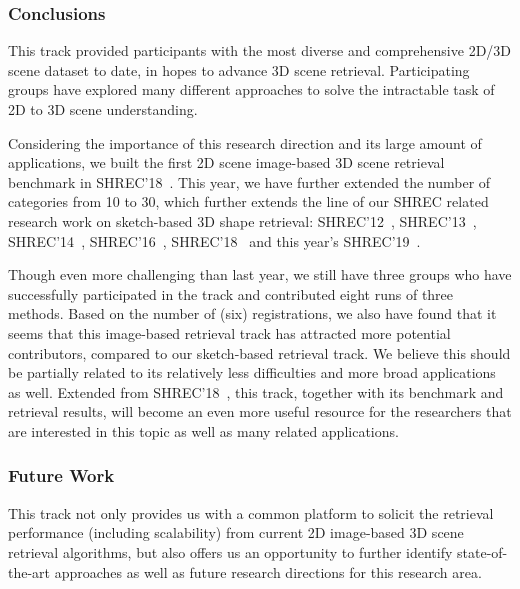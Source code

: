 \documentclass[../main.tex]{subfiles}
\begin{document}
\subsubsection{Conclusions}
This track provided participants with the most diverse and comprehensive 2D/3D scene dataset to date, in hopes to advance 3D scene retrieval. Participating groups have explored many different approaches to solve the intractable task of 2D to 3D scene understanding.

Considering the importance of this research direction and its large amount of applications, we built the first 2D scene image-based 3D scene retrieval benchmark in SHREC'18~\cite{SHREC18-SceneIBR-Track}. This year, we have further extended the number of categories from 10 to 30, which further extends the line of our SHREC related research work on sketch-based 3D shape retrieval: SHREC'12~\cite{DBLP:conf/3dor/LiSGABBCEFHHJKORSSYYY12, DBLP:journals/cviu/0013LGSBFFFJMOPS14}, SHREC'13~\cite{DBLP:conf/3dor/LiLGSAJST13, DBLP:journals/cviu/0013LGSBFFFJMOPS14}, SHREC'14~\cite{DBLP:conf/3dor/LiLLGSABFFJLOTZ14, DBLP:journals/cviu/LiLLGSABCCFFFLLJKKOTWZZ15}, SHREC'16~\cite{DBLP:conf/3dor/0013LDDFQLLLLOT16}, SHREC'18~\cite{SHREC18-SceneIBR-Track} and this year's SHREC'19~\cite{SceneIBR19}.

Though even more challenging than last year, we still have three groups who have successfully participated in the track and contributed eight runs of three methods. Based on the number of (six) registrations, we also have found that it seems that this image-based retrieval track has attracted more potential contributors, compared to our sketch-based retrieval track. We believe this should be partially related to its relatively less difficulties and more broad applications as well. Extended from SHREC'18~\cite{SHREC18-SceneIBR-Track}, this track, together with its benchmark and retrieval results, will become an even more useful resource for the researchers that are interested in this topic as well as many related applications.


\subsubsection{Future Work}
This track not only provides us with a common platform to solicit the retrieval performance (including scalability) from current 2D image-based 3D scene retrieval algorithms, but also offers us an opportunity to further identify state-of-the-art approaches as well as future research directions for this research area.
\end{document}
